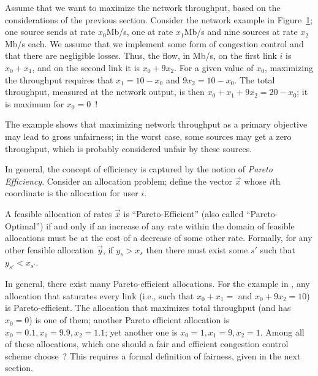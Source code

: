 
Assume that we want to maximize the network throughput, based
on the considerations of the previous section.  Consider the
network example in Figure~\ref{D31-f3}; one source sends at rate $x_0$Mb/s, one at rate $x_1$Mb/s and nine sources at rate $x_2$Mb/s each.  We assume that we implement some form
of congestion control and that there are negligible losses.
Thus, the flow, in Mb/s, on the first link $i$ is $x_{0}+x_{1}$, and on the second link it is $x_{0}+9x_{2}$.   For a
given value of $x_{0}$, maximizing the throughput
requires that $x_{1}= 10 - x_{0}$  and $9x_{2}= 10 - x_{0}$.
The total throughput, measured at the network output, is then
$x_0+x_1+9x_2=20-x_0$; it is maximum for $x_{0} = 0$~!

\begin{figure}[htbp]
        \protect\label{D31-f3}
\end{figure}

The example shows that maximizing network throughput as a
primary objective may lead to gross unfairness; in the worst
case, some sources may get a zero throughput, which is
probably considered unfair by these sources.

In general, the concept of efficiency is captured by the notion of \emph{Pareto Efficiency}. Consider an allocation problem; define the vector $\vec{x}$
whose $i$th coordinate is the allocation for user $i$. %
\begin{definition}
       A feasible allocation of rates
$\vec{x}$ is ``Pareto-Efficient'' (also called ``Pareto-Optimal'') if and only if an increase of
any rate within the domain of feasible allocations must be at
the cost of a decrease of some other rate. Formally,
for any other feasible allocation $\vec{y}$, if $y_{s} >
x_{s}$ then there must exist some $s'$ such that $y_{s'} < x_{s'}$. \label{def-paretoeff}
\end{definition}

In general, there exist many Pareto-efficient allocations. For the example in , any allocation that saturates every link (i.e., such that $x_0+x_{1}=$  and $x_0+9x_{2}= 10$) is Pareto-efficient. The allocation that maximizes total throughput (and has $x_0=0$) is one of them; another Pareto efficient allocation is $x_0=0.1, x_1=9.9, x_2=1.1$; yet another one is $x_0=1, x_1=9, x_2=1$. Among all of these allocations, which one should a fair and efficient congestion control scheme choose~? This requires a formal definition of fairness, given in the next section.
